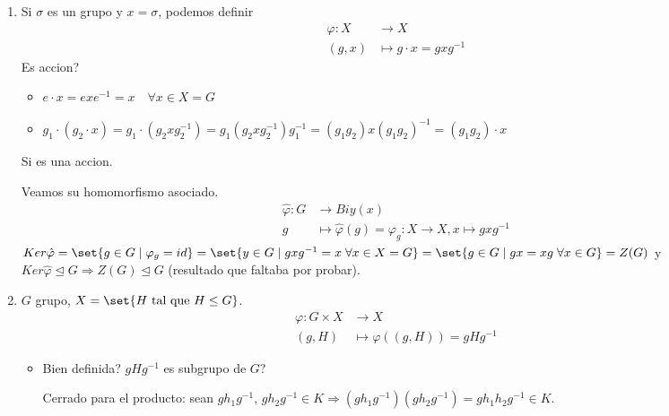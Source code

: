 \begin{example}
	\begin{enumerate}
		\item Si \(\sigma \) es un grupo y \(x = \sigma\), podemos definir
		      \[
			      \begin{aligned}
				      \varphi \colon X & \longrightarrow   X              \\
				      (g,x)            & \longmapsto g \cdot x = gxg^{-1}
			      \end{aligned}
		      \]
		      Es accion?
		      \begin{itemize}
			      \item \(e \cdot x = e x e^{-1}  = x \quad \forall x \in X = G \)
			      \item \(g_1 \cdot(g_2 \cdot x ) = g_1 \cdot (g_2 x g^{-1}_2) = g_1 (g_2 x g^{-1}_2) g^{-1}_1 = (g_1 g_2) x (g_1 g_2)^{-1} = (g_1 g_2) \cdot x  \)
		      \end{itemize}
		      Si es una accion.
		      
		      Veamos su homomorfismo asociado.
		      \[
			      \begin{aligned}
				      \hat{\varphi}\colon G & \longrightarrow Biy(x )                                                       \\
				      g                     & \longmapsto \hat{\varphi}(g ) = \varphi_g\colon X \to X, x \mapsto g x g^{-1}
			      \end{aligned}
		      \]
		      \(Ker \hat{\varphi} = \set{g \in G \mid \varphi_g = id} = \set{y \in G \mid gx g^{-1} = x \; \forall x \in X = G} = \set{g \in G \mid gx = xg \; \forall x \in G} = Z(G )\) y \(Ker\hat{\varphi} \trianglelefteq G \Rightarrow Z(G) \trianglelefteq G\) (resultado que faltaba por probar).
		\item \(G \) grupo, \(X = \set{H \text{ tal que }H \leq G }\).
		      \[
			      \begin{aligned}
				      \varphi\colon G \times X & \longrightarrow X                       \\
				      (g,H )                   & \longmapsto \varphi((g,H )) = gH g^{-1}
			      \end{aligned}
		      \]
		      \begin{itemize}
			      \item Bien definida? \(gH g^{-1}  \) es subgrupo de \(G \)?
			            
			            Cerrado para el producto: sean \(g h_1 g^{-1} \), \(g h_2 g^{-1}  \in K \Rightarrow (g h_1 g^{-1} )(g h_2 g^{-1} ) = g h_1 h_2 g^{-1}  \in K\).
			            

\end{itemize}
\end{enumerate}
\end{example}
